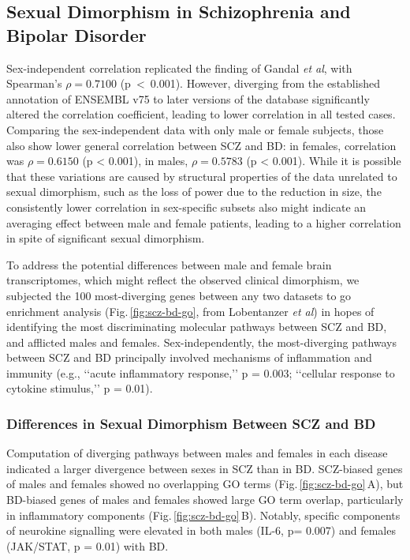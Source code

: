 \subsection{Sexual Dimorphism in Schizophrenia and Bipolar Disorder}
Sex-independent correlation replicated the finding of Gandal \emph{et al}\cite{Gandal2018}, with Spearman's $\rho = 0.7100$ \mbox{(p < 0.001)}. However, diverging from the established annotation of ENSEMBL v75 to later versions of the database significantly altered the correlation coefficient, leading to lower correlation in all tested cases. Comparing the sex-independent data with only male or female subjects, those also show lower general correlation between SCZ and BD: in females, correlation was $\rho = 0.6150$ (p < 0.001), in males, $\rho = 0.5783$ (p < 0.001). While it is possible that these variations are caused by structural properties of the data unrelated to sexual dimorphism, such as the loss of power due to the reduction in size, the consistently lower correlation in sex-specific subsets also might indicate an averaging effect between male and female patients, leading to a higher correlation in spite of significant sexual dimorphism.

 To address the potential differences between male and female brain transcriptomes, which might reflect the observed clinical dimorphism, we subjected the 100 most-diverging genes between any two datasets to \ac{go} enrichment analysis (Fig.\,\ref{fig:scz-bd-go}, from Lobentanzer \emph{et al}\cite{Lobentanzer2019a}) in hopes of identifying the most discriminating molecular pathways between SCZ and BD, and afflicted males and females. Sex-independently, the most-diverging pathways between SCZ and BD principally involved mechanisms of inflammation and immunity (e.g., ‘‘acute inflammatory response,’’ p = 0.003; ‘‘cellular response to cytokine stimulus,’’ p = 0.01).

\subsubsection{Differences in Sexual Dimorphism Between SCZ and BD}
Computation of diverging pathways between males and females in each disease indicated a larger divergence between sexes in SCZ than in BD. SCZ-biased genes of males and females showed no overlapping GO terms (Fig.\,\ref{fig:scz-bd-go}\,A), but BD-biased genes of males and females showed large GO term overlap, particularly in inflammatory components (Fig.\,\ref{fig:scz-bd-go}\,B). Notably, specific components of neurokine signalling were elevated in both males (IL-6, p= 0.007) and females (JAK/STAT, p = 0.01) with BD.

